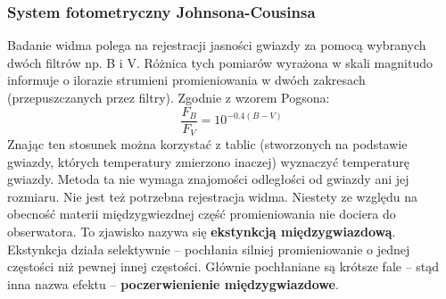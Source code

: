 \documentclass[../index.tex]{subfiles}
\begin{document}
            \subsubsection{System fotometryczny Johnsona-Cousinsa}
                Badanie widma polega na rejestracji jasności gwiazdy za pomocą wybranych dwóch filtrów np. B i V. Różnica tych pomiarów wyrażona w skali magnitudo informuje o ilorazie strumieni promieniowania w dwóch zakresach (przepuszczanych przez filtry). Zgodnie z wzorem Pogsona:
                \begin{equation}
                    \frac{F_B}{F_V} = 10^{ - 0.4(B - V)}
                \end{equation}
                Znając ten stosunek można korzystać z tablic (stworzonych na podstawie gwiazdy, których temperatury zmierzono inaczej) wyznaczyć temperaturę gwiazdy. Metoda ta nie wymaga znajomości odległości od gwiazdy ani jej rozmiaru. Nie jest też potrzebna rejestracja widma. Niestety ze względu na obecność materii międzygwiezdnej część promieniowania nie dociera do obserwatora. To zjawisko nazywa się \textbf{ekstynkcją międzygwiazdową}. Ekstynkcja działa selektywnie \--- pochłania silniej promieniowanie o jednej częstości niż pewnej innej częstości. Głównie pochłaniane są krótsze fale \--- stąd inna nazwa efektu \--- \textbf{poczerwienienie międzygwiazdowe}.
\end{document}

